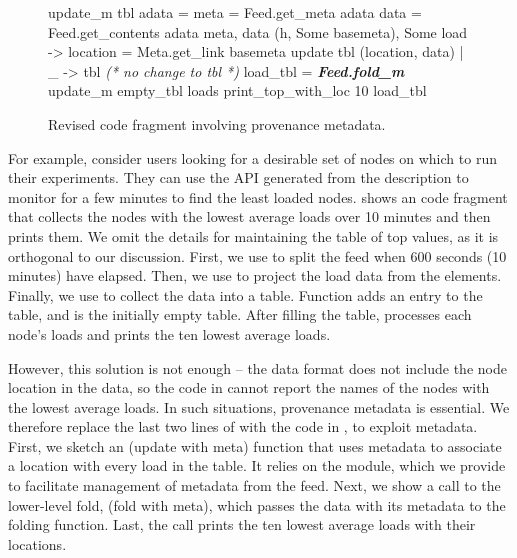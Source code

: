 \begin{figure}[tb]

\begin{codebox}
 update_m  tbl adata =
   meta = Feed.get_meta adata 
   data = Feed.get_contents adata 
   meta, data  
    (h, Some basemeta), Some load ->
       location = Meta.get_link basemeta 
      update tbl (location, data)
  | _ -> tbl \textit{ (* no change to tbl *)} 
 load_tbl = \textit{\textbf{Feed.fold_m}} update_m empty_tbl loads
 print_top_with_loc 10 load_tbl
\end{codebox}
  \caption{Revised code fragment involving provenance metadata. }
\label{fig:sample-loads-prov}
\end{figure}

For example, consider \planetlab users looking for a desirable set of
nodes on which to run their experiments. 
They can use the API generated from the \comon description 
to monitor \planetlab for a few
minutes to find the least loaded nodes. 
shows an \ocaml{} code fragment that collects the nodes with the
lowest average loads over 10 minutes and then prints them. 
We omit the details for maintaining the table of top values, as it is
orthogonal to our discussion. 
First, we use  to
split the feed when 600 seconds (10 minutes) have elapsed. Then, we
use  to project the load data from the \comon
elements. Finally, we use  to collect the data
into a table. Function  adds an entry to the table, and
 is the initially empty table.
After filling the table, 
processes each node's loads
and prints the ten lowest average loads.

However, this solution is not enough -- the \comon data format
does not include the node location in the data, so the code in
 cannot report the names of the nodes with the lowest
average loads.
In such situations, provenance metadata is essential. We therefore replace the last two lines of
 with the code in
, to exploit metadata. First, we sketch an 
 (update with meta) function that uses
metadata to associate a location with every load in the table. It relies on the  module, 
which we provide to facilitate management of metadata from the feed. Next, 
we show a call to the lower-level fold,  (fold with meta), which passes the 
data with its metadata to the folding
function.  Last, the call  prints the ten 
lowest average loads with their locations.


